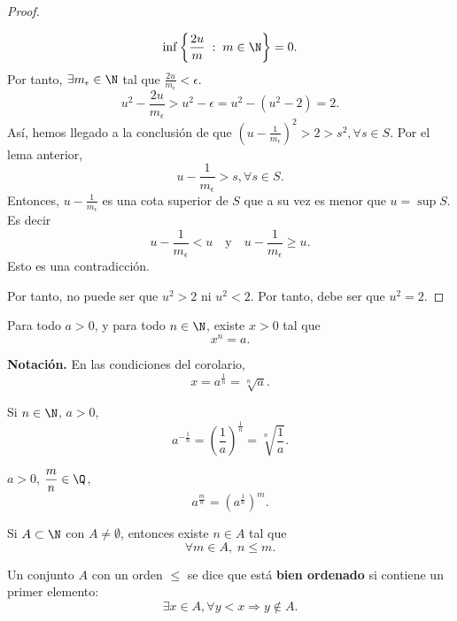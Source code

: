 \begin{proof}
\begin{description}
\[\inf \left\{ \frac{2u}{m} \; : \; m \in \N\right\} = 0 .\]
Por tanto, $\displaystyle \exists m_{\epsilon } \in \N $ tal que $\displaystyle \frac{2u}{m_{\epsilon }} < \epsilon  $.
\[u^{2} - \frac{2u}{m_{\epsilon }} > u^{2} - \epsilon = u^{2} - \left(u^{2} - 2\right) = 2 .\]
Así, hemos llegado a la conclusión de que $\displaystyle \left(u - \frac{1}{m_{\epsilon }}\right)^{2} > 2 > s^{2}, \forall s \in S $. Por el lema anterior, 
\[u - \frac{1}{m_{\epsilon }} > s, \forall s \in S .\]
Entonces, $\displaystyle u - \frac{1}{m_{\epsilon }} $ es una cota superior de $\displaystyle S $ que a su vez es menor que $\displaystyle u = \sup S $. Es decir
\[u - \frac{1}{m_{\epsilon }} < u \quad \text{y} \quad u - \frac{1}{m_{\epsilon }} \geq u .\]
Esto es una contradicción.
\end{description}
Por tanto, no puede ser que $\displaystyle u^{2}>2 $ ni $\displaystyle u^{2} <2 $. Por tanto, debe ser que $\displaystyle u^{2} = 2 $. 
\end{proof}

\begin{fcolorary}[]
\normalfont Para todo $\displaystyle a > 0 $, y para todo $\displaystyle n \in \N $, existe $\displaystyle x > 0 $ tal que 
\[x^{n} = a .\]
\end{fcolorary}

\textbf{Notación.} En las condiciones del corolario, 
\[x = a ^{\frac{1}{n}} = \sqrt[n]{a} .\]

\begin{fdefinition}[]
\normalfont Si $\displaystyle n \in \N $, $\displaystyle a > 0 $, 
\[a ^{- \frac{1}{n}} = \left(\frac{1}{a}\right)^{\frac{1}{n}} = \sqrt[n]{\frac{1}{a}} .\]
\end{fdefinition}

\begin{fdefinition}[]
\normalfont $\displaystyle a > 0 $, $\displaystyle \frac{m}{n} \in \Q $, 
\[a^{\frac{m}{n}} = \left(a^{\frac{1}{n}}\right)^{m} .\]
\end{fdefinition}

\begin{fprop}
\normalfont Si $\displaystyle A \subset \N $ con $\displaystyle A \neq \emptyset $, entonces existe $\displaystyle n \in A $ tal que 
\[\forall m \in A, \; n \leq m .\]
\end{fprop}

\begin{fdefinition}[]
\normalfont Un conjunto $\displaystyle A $ con un orden $\displaystyle \leq $ se dice que está \textbf{bien ordenado} si contiene un primer elemento:
\[\exists x \in A, \forall y < x \Rightarrow y \not\in A .\]

\end{fdefinition}

